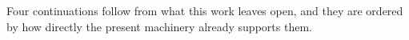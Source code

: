 \documentclass[a4paper]{cas-sc}
\begin{document}
%

Four continuations follow from what this work leaves open, and they are
ordered by how directly the present machinery already supports them.
\end{document}
